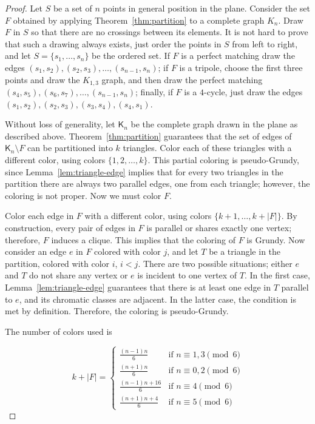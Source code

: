 \documentclass[10pt,a4paper]{amsart}
\begin{document}
\begin{proof}

Let $S$ be a set of $n$ points in general position in the plane. Consider the set $F$ obtained by applying Theorem~\ref{thm:partition} to a complete graph $K_n$. Draw $F$ in $S$ so that there are no crossings between its elements. It is not hard to prove that such a drawing always exists, just order the points in $S$ from left to right, and let $S=\{s_1, \ldots, s_n\}$ be the ordered set. If $F$ is a perfect matching draw the edges $(s_1,s_2), (s_2,s_3), \ldots, (s_{n-1}, s_n)$; if $F$ is a tripole, choose the first three points and draw the $K_{1,3}$ graph, and then draw the perfect matching $(s_4,s_5), (s_6,s_7), \ldots, (s_{n-1}, s_n)$; finally, if $F$ is a $4$-cycle, just draw the edges $(s_1,s_2), (s_2,s_3), (s_3,s_4), (s_4,s_1)$.

Without loss of generality, let $\mathsf{K}_n$ be the complete graph drawn in the plane as described above. Theorem~\ref{thm:partition} guarantees that the set of edges of $\mathsf{K}_n \setminus F$ can be partitioned into $k$ triangles. Color each of these triangles with a different color, using colors $\{1, 2, \ldots, k\}$. 
This partial coloring is pseudo-Grundy, since Lemma~\ref{lem:triangle-edge} implies that for every two triangles in the partition there are always two parallel edges, one from each triangle; however, the coloring is not proper. Now we must color $F$.

Color each edge in $F$ with a different color, using colors $\{k+1, \ldots, k+|F|\}$. By construction, every pair of edges in $F$ is parallel or shares exactly one vertex; therefore, $F$ induces a clique. This implies that the coloring of $F$ is Grundy. Now consider an edge $e$ in $F$ colored with color $j$, and let $T$ be a triangle in the partition, colored with color $i$, $i < j$. There are two possible situations; either $e$ and $T$ do not share any vertex or $e$ is incident to one vertex of $T$. In the first case, Lemma~\ref{lem:triangle-edge} guarantees that there is at least one edge in $T$ parallel to $e$, and its chromatic classes are adjacent. In the latter case, the condition is met by definition. Therefore, the coloring is pseudo-Grundy.


The number of colors used is 

\begin{equation*}
 k + |F|  = 
  \begin{cases}
    \frac{(n-1)n}{6} & \text{if } n\equiv 1, 3 \pmod 6\\
    \frac{(n+1)n}{6} & \text{if } n\equiv 0, 2 \pmod 6\\
     \frac{(n-1)n+16}{6}  & \text{if } n\equiv 4 \pmod 6\\
    \frac{(n+1)n+4}{6} & \text{if } n\equiv 5 \pmod 6
  \end{cases}
\end{equation*}
\end{proof}
\end{document}
